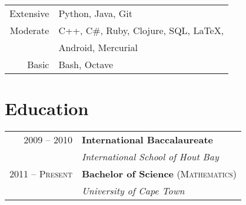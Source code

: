 \documentclass[a4paper,10pt]{article} %
\begin{document}
\begin{minipage}[t]{0.5\textwidth}
\begin{tabular}{rl}
Extensive
& Python, Java, Git \\
Moderate
& C++, C\#, Ruby, Clojure, SQL, \LaTeX, \\
& Android, Mercurial \\
Basic
& Bash, Octave \\
\end{tabular}


\section{Education} 

\begin{tabular}{rl} %


2009 -- 2010 & \textbf{International Baccalaureate} \\ 
& \textit{International School of Hout Bay}\\
	 

2011 -- \textsc{Present} & \textbf{Bachelor of Science} \textsc{(Mathematics)} \\ 
& \textit{University of Cape Town}\\
	 

\end{tabular}\\[10pt]



\end{minipage}
\end{document}
